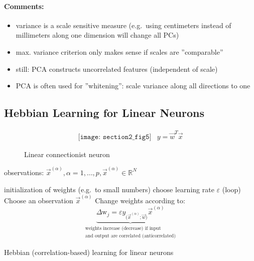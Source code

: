 \paragraph{Comments:}
\begin{itemize}
\item variance is a scale sensitive measure (e.g.\ using centimeters instead
  of millimeters along one dimension will change all PCs)
	\item max. variance criterion only makes sense if scales are 
		''comparable''
	\item still: PCA constructs uncorrelated features (independent of scale)
	\item PCA is often used for ''whitening'': scale variance along all
		directions to one
\end{itemize}


\newpage 						%
\subsection{Hebbian Learning for Linear Neurons}
\begin{figure}[h]
  \centering
\[ \begin{array}{ll}
	\texttt{[image: section2\_fig5]}
	& y = \vec{w}^T \vec{x}
\end{array} \]
  \caption{Linear connectionist neuron}
  \label{fig:linearConnectionistNeuron}
\end{figure}
observations: $\vec{x}^{(\alpha)}, \alpha = 1, \ldots, p, \vec{x}^{(\alpha)} \in \mathbb{R}^N$

\begin{algorithm}[h]
  \DontPrintSemicolon
  initialization of weights (e.g.\ to small numbers)\;
  choose learning rate $\varepsilon$\;
  \Begin(loop){
    Choose an observation  $\vec{x}^{(\alpha)}$\;
    Change weights according to:\;
    \begin{equation}
      \underbrace{ \Delta \mathrm{w}_j = \varepsilon 
        y_{ \big( \vec{x}^{(\alpha)}; \vec{w} \big) }
        \vec{x}^{(\alpha)} }_{
        \substack{\text{weights increase (decrease) if input}\\
          \text{and output are correlated (anticorrelated)}}}
    \end{equation}    
  }
  \label{alg:HebbianLearning}
  \caption{Hebbian (correlation-based) learning for linear neurons}
\end{algorithm}

